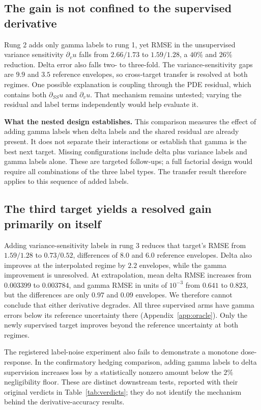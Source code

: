 \documentclass{article}
\begin{document}
\subsection{The gain is not confined to the supervised derivative}
\label{sec:transfer}

Rung 2 adds only gamma labels to rung 1, yet RMSE in the unsupervised variance
sensitivity $\partial_vu$ falls from $2.66/1.73$ to $1.59/1.28$, a $40\%$ and
$26\%$ reduction. Delta error also falls two- to three-fold. The variance-sensitivity
gaps are $9.9$ and $3.5$ reference envelopes, so cross-target transfer is resolved
at both regimes. One possible explanation is coupling through the PDE residual,
which contains both $\partial_{SS}u$ and $\partial_vu$. That mechanism remains
untested; varying the residual and label terms independently would help evaluate it.

\textbf{What the nested design establishes.} This comparison measures the effect
of adding gamma labels when delta labels and the shared residual are already
present. It does not separate their interactions or establish that gamma is the
best next target. Missing configurations include delta plus variance labels and
gamma labels alone. These are targeted follow-ups; a full factorial design would
require all combinations of the three label types. The transfer result therefore
applies to this sequence of added labels.

\subsection{The third target yields a resolved gain primarily on itself}
\label{sec:budget}

Adding variance-sensitivity labels in rung 3 reduces that target's RMSE from
$1.59/1.28$ to $0.73/0.52$, differences of $8.0$ and $6.0$ reference envelopes.
Delta also improves at the interpolated regime by $2.2$ envelopes, while the gamma
improvement is unresolved. At extrapolation, mean delta RMSE increases from
$0.003399$ to $0.003784$, and gamma RMSE in units of $10^{-3}$ from $0.641$ to
$0.823$, but the
differences are only $0.97$ and $0.09$ envelopes. We therefore cannot conclude that
either derivative degrades. All three supervised arms have gamma errors below its
reference uncertainty there (Appendix~\ref{app:oracle}). Only the newly supervised
target improves beyond the reference uncertainty at both regimes.

The registered label-noise experiment also fails to demonstrate a monotone
dose-response. In the confirmatory hedging comparison, adding gamma labels to delta
supervision increases loss by a statistically nonzero amount below the $2\%$
negligibility floor. These are distinct downstream tests, reported with their
original verdicts in Table~\ref{tab:verdicts}; they do not identify the mechanism
behind the derivative-accuracy results.
\end{document}
